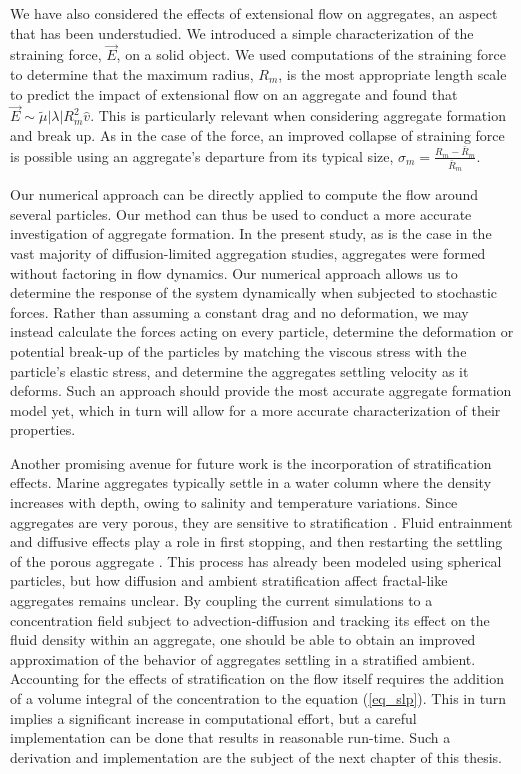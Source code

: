 We have also considered the effects of extensional flow on aggregates, an aspect that has been understudied. We introduced a simple characterization of the straining force, $\vec{E}$, on a solid object. We used computations of the straining force to determine that the maximum radius, $R_m$, is the most appropriate length scale to predict the impact of extensional flow on an aggregate and found that $\vec{E} \sim \tilde{\mu} |\lambda| R_m^2 \hat{v}$. This is particularly relevant when considering aggregate formation and break up. As in the case of the force, an improved collapse
of straining force is 
possible using an aggregate's departure from its typical size, $\sigma_m = \frac{R_m - \bar{R}_m}{\bar{R}_m}$. 


Our numerical approach can be directly applied to compute the flow around several particles. Our method can thus be used to conduct a more accurate investigation of aggregate formation. In the present study, as is the case in the vast majority of diffusion-limited aggregation studies, aggregates were formed without factoring in flow dynamics. Our numerical approach allows us to determine the response of the system dynamically when subjected to stochastic forces. Rather than assuming a constant drag and no deformation, we may instead calculate the forces acting on every particle, determine the deformation or potential break-up of the particles by matching the viscous stress with the particle's elastic stress, and determine the aggregates settling velocity as it deforms. Such an approach should provide the most accurate aggregate formation model yet, which in turn will allow for a more accurate characterization of their properties.

Another promising avenue for future work is the incorporation of stratification effects. Marine aggregates typically settle in a water column where the density increases with depth, owing to salinity and temperature variations. Since aggregates are very porous, they are sensitive to stratification \cite{prairie_delayed_2013}. 
Fluid entrainment and diffusive effects play a role in first stopping, and then restarting the settling of the porous aggregate
\cite{panah_simulations_2017}. This process has already been modeled using spherical particles, but how diffusion and ambient stratification affect fractal-like aggregates remains unclear. By coupling the current simulations to a concentration field subject to advection-diffusion and tracking its effect on the fluid density within an aggregate, one should be able to obtain an improved approximation of the behavior of aggregates settling in a stratified ambient. 
Accounting for the effects of stratification on the flow itself requires the addition of a volume integral of the concentration to the equation (\ref{eq_slp}). This in turn implies a significant increase in computational effort, but a careful implementation can be done that results in reasonable run-time. Such a derivation and implementation are the subject of the next chapter of this thesis. 
